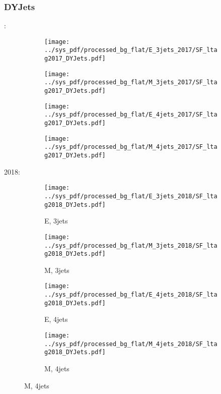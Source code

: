 \documentclass{beamer}
\begin{document}
\begin{frame}
\frametitle{DYJets}
\fontsize{5}{1}:
\begin{figure}
\centering
\begin{subfigure}[b]{0.24\textwidth}
\texttt{[image: ../sys\_pdf/processed\_bg\_flat/E\_3jets\_2017/SF\_ltag2017\_DYJets.pdf]}
\end{subfigure}
\begin{subfigure}[b]{0.24\textwidth}
\texttt{[image: ../sys\_pdf/processed\_bg\_flat/M\_3jets\_2017/SF\_ltag2017\_DYJets.pdf]}
\end{subfigure}
\begin{subfigure}[b]{0.24\textwidth}
\texttt{[image: ../sys\_pdf/processed\_bg\_flat/E\_4jets\_2017/SF\_ltag2017\_DYJets.pdf]}
\end{subfigure}
\begin{subfigure}[b]{0.24\textwidth}
\texttt{[image: ../sys\_pdf/processed\_bg\_flat/M\_4jets\_2017/SF\_ltag2017\_DYJets.pdf]}
\end{subfigure}
\end{figure}
2018:
\begin{figure}
\centering
\begin{subfigure}[b]{0.24\textwidth}
\texttt{[image: ../sys\_pdf/processed\_bg\_flat/E\_3jets\_2018/SF\_ltag2018\_DYJets.pdf]}
\captionsetup{font=tiny}
\caption{E, 3jets}
\end{subfigure}
\begin{subfigure}[b]{0.24\textwidth}
\texttt{[image: ../sys\_pdf/processed\_bg\_flat/M\_3jets\_2018/SF\_ltag2018\_DYJets.pdf]}
\captionsetup{font=tiny}
\caption{M, 3jets}
\end{subfigure}
\begin{subfigure}[b]{0.24\textwidth}
\texttt{[image: ../sys\_pdf/processed\_bg\_flat/E\_4jets\_2018/SF\_ltag2018\_DYJets.pdf]}
\captionsetup{font=tiny}
\caption{E, 4jets}
\end{subfigure}
\begin{subfigure}[b]{0.24\textwidth}
\texttt{[image: ../sys\_pdf/processed\_bg\_flat/M\_4jets\_2018/SF\_ltag2018\_DYJets.pdf]}
\captionsetup{font=tiny}
\caption{M, 4jets}
\end{subfigure}
\end{figure}
\end{frame}
\end{document}
